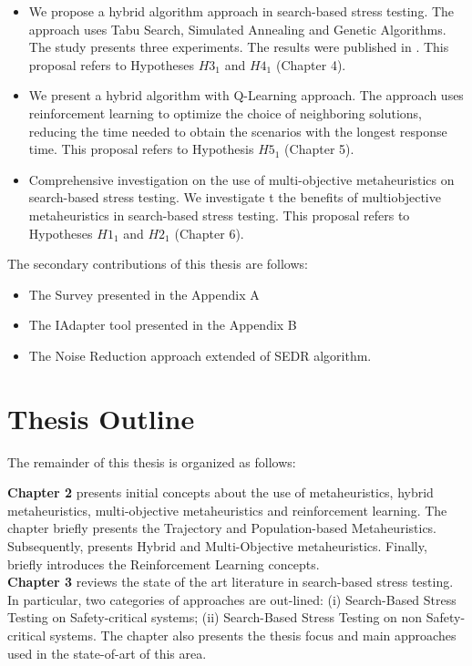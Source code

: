\documentclass[espaco=umemeio,chapter=TITLE,twoside,openright]{abnt}
\begin{document}
\begin{itemize}
\item We propose  a hybrid algorithm approach in search-based stress testing. The approach  uses Tabu Search, Simulated Annealing and Genetic Algorithms. The study presents three experiments. The results were published in  \cite{Gois2016}. This proposal refers to Hypotheses $H3_{1}$ and $H4_{1}$ (Chapter 4).
 
\item We present a hybrid algorithm with Q-Learning approach. The approach uses reinforcement learning  to optimize the choice of neighboring solutions, reducing the time needed to obtain the scenarios with the longest response time. This proposal refers to Hypothesis $H5_{1}$ (Chapter 5).

\item Comprehensive investigation on the use of multi-objective metaheuristics on search-based stress testing. We investigate t the benefits of multiobjective metaheuristics in search-based stress testing. This proposal refers to Hypotheses $H1_{1}$ and $H2_{1}$ 
 (Chapter 6).
\end{itemize}


The secondary contributions of this thesis are follows:

\begin{itemize}
\item The Survey presented in the Appendix A
\item The IAdapter tool presented in the Appendix B
\item The Noise Reduction approach extended of SEDR algorithm.
\end{itemize}



\section{Thesis Outline}

The remainder of this thesis is organized as follows:

\textbf{Chapter 2} presents initial concepts about the use of metaheuristics, hybrid metaheuristics, multi-objective metaheuristics and reinforcement learning. The chapter briefly presents the Trajectory and Population-based Metaheuristics.  Subsequently, presents Hybrid and Multi-Objective metaheuristics. Finally, briefly introduces the Reinforcement Learning concepts. 
\\

\textbf{Chapter 3} reviews the state of the art literature in search-based stress testing. In particular, two categories of approaches are out-lined: (i) Search-Based Stress Testing on Safety-critical systems; (ii) Search-Based Stress Testing on non Safety-critical systems. The chapter also presents the thesis focus and main approaches used in  the state-of-art of this area.
\\
\end{document}
